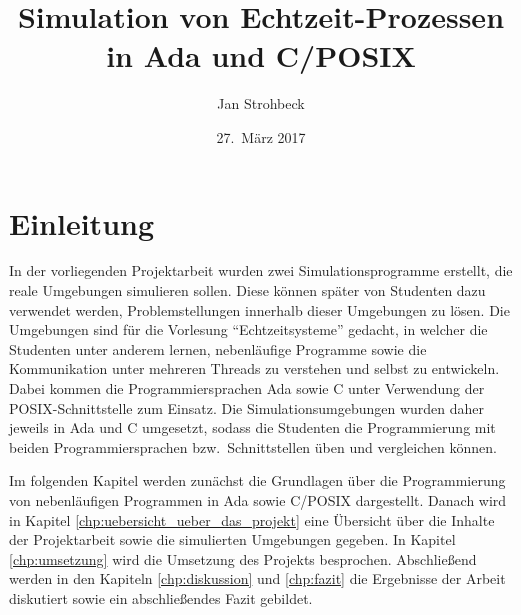 \documentclass[oneside]{elaboration}
\begin{document}
\author{Jan Strohbeck}
\title{\textbf{Simulation von Echtzeit-Prozessen in Ada und C/POSIX}}
\date{27.\ März 2017}

\maketitle
\newpage


\tableofcontents
\newpage

\setcounter{page}{1}


\listoffigures
{}
\newpage

\setcounter{page}{1}

\renewcommand*{\chapterpagestyle}{scrheadings}

\chapter{Einleitung}
\label{chp:einleitung}

In der vorliegenden Projektarbeit wurden zwei Simulationsprogramme erstellt,
die reale Umgebungen simulieren sollen. Diese können später von Studenten dazu
verwendet werden, Problemstellungen innerhalb dieser Umgebungen zu lösen. Die
Umgebungen sind für die Vorlesung \enquote{Echtzeitsysteme} gedacht, in welcher
die Studenten unter anderem lernen, nebenläufige Programme sowie die
Kommunikation unter mehreren Threads zu verstehen und selbst zu entwickeln.
Dabei kommen die Programmiersprachen Ada sowie C unter Verwendung der
POSIX-Schnittstelle zum Einsatz. Die Simulationsumgebungen wurden daher jeweils in
Ada und C umgesetzt, sodass die Studenten die Programmierung mit beiden
Programmiersprachen bzw.\ Schnittstellen üben und vergleichen können.

Im folgenden Kapitel werden zunächst die Grundlagen über die Programmierung von
nebenläufigen Programmen in Ada sowie C/POSIX dargestellt. Danach wird in
Kapitel \ref{chp:uebersicht_ueber_das_projekt} eine Übersicht über die Inhalte
der Projektarbeit sowie die simulierten Umgebungen gegeben. In Kapitel
\ref{chp:umsetzung} wird die Umsetzung des Projekts besprochen. Abschließend
werden in den Kapiteln \ref{chp:diskussion} und \ref{chp:fazit} die Ergebnisse
der Arbeit diskutiert sowie ein abschließendes Fazit gebildet.
\end{document}
